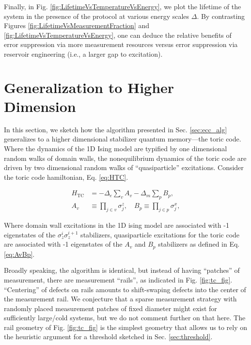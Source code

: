 \documentclass[twocolumn,superscriptaddress,aps,prb,floatfix]{revtex4-1}
\newcommand{\Htc}{H_{\mathrm{TC}}}
\newcommand{\figref}[1]{Fig. \ref{#1}}
\begin{document}
Finally, in Fig. \ref{fig:LifetimeVsTemperatureVsEnergy}, we plot the lifetime of the system in the presence of the protocol at various energy scales $\Delta$.  By contrasting Figures \ref{fig:LifetimeVsMeasurementFraction} and \ref{fig:LifetimeVsTemperatureVsEnergy}, one can deduce the relative benefits of error suppression via more measurement resources versus error suppression via reservoir engineering (i.e., a larger gap to excitation).



\section{Generalization to Higher Dimension}
\label{sec:tc_alg}

 In this section, we sketch how the algorithm presented in Sec. \ref{sec:ecc_alg} generalizes to a higher dimensional stabilizer quantum memory---the toric code.  Where the dynamics of the 1D Ising model are typified by one dimensional random walks of domain walls, the nonequilibrium dynamics of the toric code are driven by two dimensional random walks of ``quasiparticle'' excitations.  Consider the toric code hamiltonian, Eq. \ref{eq:HTC}.

 \begin{align}
\Htc &= -\Delta_e \sum_v A_v -\Delta_m \sum_p B_p ,\label{eq:HTC}\\
A_v &\equiv \prod_{j \in v} \sigma_j^z,\quad B_p \equiv \prod_{j \in p} \sigma_j^x,\label{eq:AvBp}
\end{align}

Where domain wall excitations in the 1D ising model are associated with -1 eigenstates of the $\sigma_z^i \sigma_z^{i+1}$ stabilizers, quasiparticle excitations for the toric code are associated with -1 eigenstates of the $A_v$ and $B_p$ stabilizers as defined in Eq. \ref{eq:AvBp}.
 
 Broadly speaking, the algorithm is identical, but instead of having ``patches'' of measurement, there are measurement ``rails'', as indicated in \figref{fig:tc_fig}.  ``Centering'' of defects on rails amounts to shift-swaping defects into the center of the measurement rail.  We conjecture that a sparse measurement strategy with randomly placed measurement patches of fixed diameter might exist for sufficiently large/cold systems, but we do not comment further on that here.  The rail geometry of \figref{fig:tc_fig} is the simplest geometry that allows us to rely on the heuristic argument for a threshold sketched in Sec. \ref{sec:threshold}.
\end{document}

